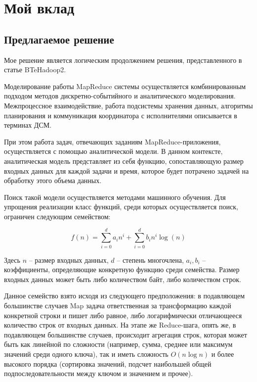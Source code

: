 \documentclass[../diploma.tex]{subfile}
\begin{document}
    \section{Мой вклад}\label{sec:results}

    \subsection{Предлагаемое решение}
    \label{sec:results:subsec:proposal}

    Мое решение является логическим продолжением решения, представленного в
    статье BTeHadoop2\cite{baseline_model}. 

    Моделирование работы MapReduce системы осуществляется комбинированным
    подходом методов дискретно-событийного и аналитического моделирования.
    Межпроцессное взаимодействие, работа подсистемы хранения данных, алгоритмы
    планирования и коммуникация координатора с исполнителями описывается в
    терминах ДСМ. 
    
    При этом работа задач, отвечающих заданиям MapReduce-приложения,
    осуществляется с помощью аналитической модели. В данном контексте,
    аналитическая модель представляет из себя функцию, сопоставляющую размер
    входных данных для каждой задачи и время, которое будет потрачено задачей на
    обработку этого объема данных.

    Поиск такой модели осуществляется методами машинного обучения. Для упрощения
    реализации класс функций, среди которых осуществляется поиск, ограничен
    следующим семейством:
    
    \begin{equation} 
        \label{eq:model}
        f(n) = \sum_{i = 0}^d a_in^i + \sum_{i=0}^d b_in^i\log(n)
    \end{equation} 

    Здесь $n$ -- размер входных данных, $d$ -- степень многочлена, $a_i, b_i$ --
    коэффициенты, определяющие конкретную функцию среди семейства. Размер
    входных данных может быть либо количеством байт, либо количеством строк.

    Данное семейство взято исходя из следующего предположения: в подавляющем
    большинстве случаев Map задача ответственная за трансформацию каждой
    конкретной строки и пишет либо равное, либо логарифмически отличающееся
    количество строк от входных данных. На этапе же Reduce-шага, опять же, в
    подавляющем большинстве случаев, происходит агрегация строк, которая может
    быть как линейной по сложности (например, сумма, среднее или максимум
    значений среди одного ключа), так и иметь сложность $O(n\log n)$ и более
    высокого порядка (сортировка значений, подсчет наибольшей общей
    подпоследовательности между ключом и значением и прочее).
\end{document}
